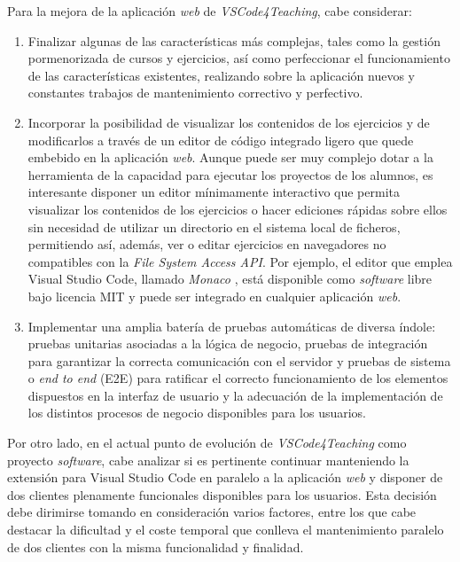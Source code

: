 \noindent Para la mejora de la aplicación \textit{web} de \textit{VSCode4Teaching}, cabe considerar:
\begin{enumerate}
    \item Finalizar algunas de las características más complejas, tales como la gestión pormenorizada de cursos y ejercicios, así como perfeccionar el funcionamiento de las características existentes, realizando sobre la aplicación nuevos y constantes trabajos de mantenimiento correctivo y perfectivo.
    \item Incorporar la posibilidad de visualizar los contenidos de los ejercicios y de modificarlos a través de un editor de código integrado ligero que quede embebido en la aplicación \textit{web}. Aunque puede ser muy complejo dotar a la herramienta de la capacidad para ejecutar los proyectos de los alumnos, es interesante disponer un editor mínimamente interactivo que permita visualizar los contenidos de los ejercicios o hacer ediciones rápidas sobre ellos sin necesidad de utilizar un directorio en el sistema local de ficheros, permitiendo así, además, ver o editar ejercicios en navegadores no compatibles con la \textit{File System Access API}. Por ejemplo, el editor que emplea Visual Studio Code, llamado \textit{Monaco} \cite{MonacoEditor}, está disponible como \textit{software} libre bajo licencia MIT y puede ser integrado en cualquier aplicación \textit{web}.
    \item Implementar una amplia batería de pruebas automáticas de diversa índole: pruebas unitarias asociadas a la lógica de negocio, pruebas de integración para garantizar la correcta comunicación con el servidor y pruebas de sistema o \textit{end to end} (E2E) para ratificar el correcto funcionamiento de los elementos dispuestos en la interfaz de usuario y la adecuación de la implementación de los distintos procesos de negocio disponibles para los usuarios.
\end{enumerate}

Por otro lado, en el actual punto de evolución de \textit{VSCode4Teaching} como proyecto \textit{software}, cabe analizar si es pertinente continuar manteniendo la extensión para Visual Studio Code en paralelo a la aplicación \textit{web} y disponer de dos clientes plenamente funcionales disponibles para los usuarios. Esta decisión debe dirimirse tomando en consideración varios factores, entre los que cabe destacar la dificultad y el coste temporal que conlleva el mantenimiento paralelo de dos clientes con la misma funcionalidad y finalidad.

